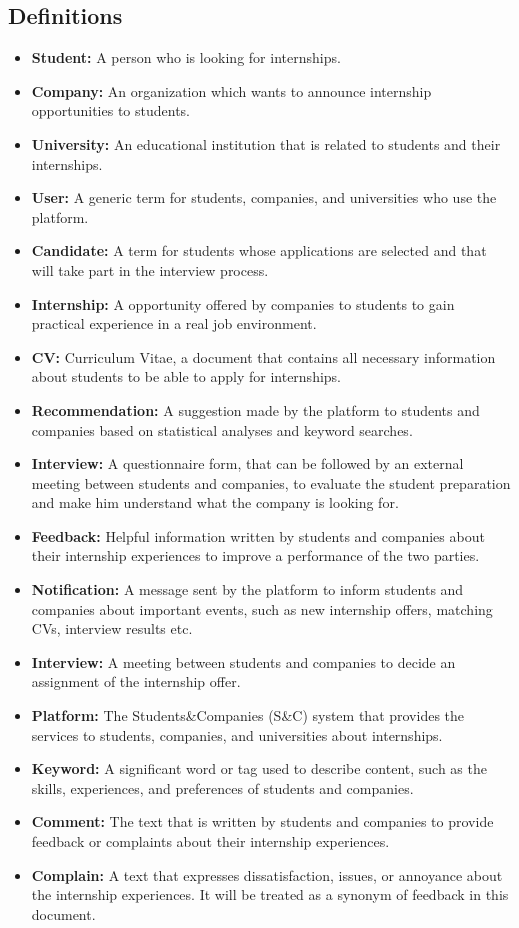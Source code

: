 \subsection{Definitions}\label{subsec:definitions}
\begin{itemize}
    \item \textbf{Student:} A person who is looking for internships.
    \item \textbf{Company:} An organization which wants to announce internship opportunities to students.
    \item \textbf{University:} An educational institution that is related to students and their internships.
    \item \textbf{User:} A generic term for students, companies, and universities who use the platform.
    \item \textbf{Candidate:} A term for students whose applications are selected and that will take part in the interview process.
    \item \textbf{Internship:} A opportunity offered by companies to students to gain practical experience in a real job environment.
    \item \textbf{CV:} Curriculum Vitae, a document that contains all necessary information about students to be able to apply for internships.
    \item \textbf{Recommendation:} A suggestion made by the platform to students and companies based on statistical analyses and keyword searches.
    \item \textbf{Interview:} A questionnaire form, that can be followed by an external meeting between students and companies, to evaluate the
    student preparation and make him understand what the company is looking for. 
    \item \textbf{Feedback:} Helpful information written by students and companies about their internship experiences to improve a performance 
    of the two parties.
    \item \textbf{Notification:} A message sent by the platform to inform students and companies about important events, such as new internship 
    offers, matching CVs, interview results etc.
    \item \textbf{Interview:} A meeting between students and companies to decide an assignment of the internship offer.
    \item \textbf{Platform:} The Students\&Companies (S\&C) system that provides the services to students, companies, and universities about
    internships.
    \item \textbf{Keyword:} A significant word or tag used to describe content, such as the skills, experiences, and preferences of students and 
    companies.
    \item \textbf{Comment:} The text that is written by students and companies to provide feedback or complaints about their internship experiences.
    \item \textbf{Complain:} A text that expresses dissatisfaction, issues, or annoyance about the internship experiences. It will be treated as a
    synonym of feedback in this document.
\end{itemize}

